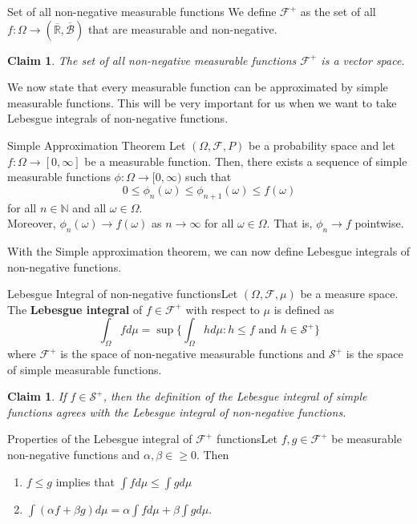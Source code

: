 \documentclass[twoside]{article}
\newtheorem{claim}[theorem]{Claim}
\newcommand{\sigmalgebra}{\mathcal{F}}
\begin{document}
\begin{definition_exam}{Set of all non-negative measurable functions}{}
We define $\mathcal{F}^+$ as the set of all $f: \Omega \rightarrow (\overline{\mathbb{R}}, \overline{\mathcal{B}})$ that are measurable and non-negative.
\end{definition_exam}

\begin{claim}The set of all non-negative measurable functions $\mathcal{F}^+$ is a vector space.
\end{claim}

We now state that every measurable function can be approximated by simple measurable functions. 
This will be very important for us when we want to take Lebesgue integrals of non-negative functions.
\begin{proposition_exam}{Simple Approximation Theorem}{} Let $(\Omega, \mathcal{F}, P)$ be a probability space and let $f: \Omega \rightarrow [0,\infty]$ be a measurable function. Then, there exists a sequence of simple measurable functions $\phi: \Omega \rightarrow [0, \infty)$ such that 
$$
0 \leq \phi_n(\omega) \leq \phi_{n+1}(\omega) \leq f(\omega)
$$
for all $n \in \mathbb{N}$ and all $\omega \in \Omega.$\\ Moreover, $\phi_n(\omega) \rightarrow f(\omega)$ as $n \rightarrow \infty$ for all $\omega \in \Omega.$ That is, $\phi_n \rightarrow f$ pointwise.
\end{proposition_exam}

With the Simple approximation theorem, we can now define Lebesgue integrals of non-negative functions.

\begin{definition_exam}{Lebesgue Integral of non-negative functions}{}Let $(\Omega, \mathcal{F}, \mu)$ be a measure space. The \textbf{Lebesgue integral} of $f \in \mathcal{F}^+$ with respect to $\mu$ is defined as 
$$
\int_{\Omega} f d\mu = \sup \bigg\{\int_{\Omega}hd\mu: h \leq f \text{ and }h \in \mathcal{S}^+  \bigg\}
$$
where $\sigmalgebra^+$ is the space of non-negative measurable functions and $\mathcal{S}^+$ is the space of simple measurable functions.
\end{definition_exam}

\begin{claim}If $f \in \mathcal{S}^+$, then the definition of the Lebesgue integral of simple functions agrees with the Lebesgue integral of non-negative functions.
\end{claim}


\begin{proposition_exam}{Properties of the Lebesgue integral of $\mathcal{F}^+$ functions}{}Let $f,g \in \mathcal{F}^+$ be measurable non-negative functions and $\alpha, \beta \in \geq 0.$ Then 
\begin{enumerate}
\item $f \leq g$ implies that $\int fd\mu \leq \int gd\mu$
\item $\int (\alpha f + \beta g)d\mu = \alpha \int fd\mu + \beta \int gd\mu.$
\end{enumerate}
\end{proposition_exam}
\end{document}
